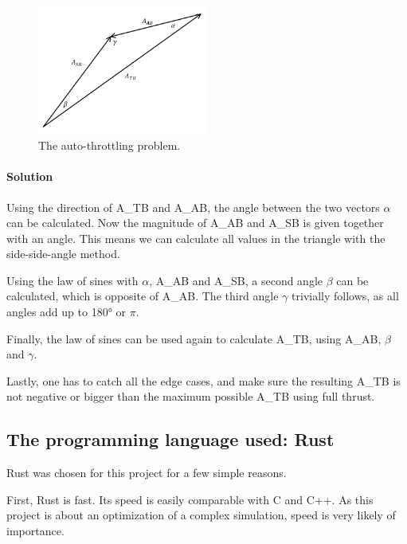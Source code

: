 \begin{figure}[!ht]
  \centering
  \includegraphics[width=0.5\textwidth]{images/auto-throttle.png}
  \caption{The auto-throttling problem.}
  \label{auto-throttle}
\end{figure}

\paragraph{Solution}

Using the direction of \gls{A_TB} and \gls{A_AB}, the angle between the two vectors \(\alpha\) can be calculated. Now the magnitude of \gls{A_AB} and \gls{A_SB} is given together with an angle. This means we can calculate all
values in the triangle with the side-side-angle method.

Using the law of sines with
\(\alpha\), \gls{A_AB} and \gls{A_SB}, a second angle \(\beta\) can be
calculated, which is opposite of \gls{A_AB}. The third angle \(\gamma\)
trivially follows, as all angles add up to 180° or \(\pi\).

Finally, the law of sines can be used again to calculate \gls{A_TB}, using
\gls{A_AB}, \(\beta\) and \(\gamma\).

Lastly, one has to catch all the edge cases, and make sure the resulting
\gls{A_TB} is not negative or bigger than the maximum possible \gls{A_TB} using full thrust.

\subsection{The programming language used:
  Rust}\label{the-programming-language-used-rust}

Rust was chosen for this project for a few simple reasons.

First, Rust is fast\cite{Benchmarks, BenchmarksGame}. Its speed is easily comparable with C and
C++. As this project is about an optimization of a complex simulation, speed
is very likely of importance.


